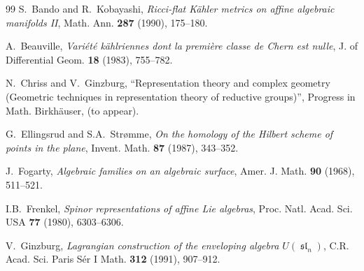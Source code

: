 \documentclass[12pt]{amsart}
\renewcommand{\frak}{\mathfrak}
\theoremstyle{definition}
\theoremstyle{remark}
\numberwithin{equation}{section}
\newcommand{\algsl}{\operatorname{\frak{sl}}} %
\begin{document}
\begin{thebibliography}{99}
 S.~Bando and R.~Kobayashi,
{\it Ricci-flat K\"ahler metrics on affine algebraic manifolds II},
Math. Ann. {\bf 287} (1990), 175--180.

 A.~Beauville,
{\it Vari\'et\'e k\"ahlriennes dont la premi\`ere classe de Chern est
  nulle},
J. of Differential Geom. {\bf 18} (1983), 755--782.




 N.~Chriss and V.~Ginzburg,
{``Representation theory and complex geometry (Geometric techniques in
  representation theory of reductive groups)''},
 Progress in Math. Birkh\"auser, (to appear).

 G.~Ellingsrud and S.A.~Str\o mme,
{\it On the homology of the Hilbert scheme of points in the plane},
Invent. Math. {\bf 87} (1987), 343--352.

 J.~Fogarty,
{\it Algebraic families on an algebraic surface},
Amer. J. Math. {\bf 90} (1968), 511--521.

 I.B.~Frenkel,
{\it Spinor representations of affine Lie algebras},
Proc. Natl. Acad. Sci. USA {\bf 77} (1980), 6303--6306.




 V.~Ginzburg,
 {\it Lagrangian construction of the enveloping algebra $U(\algsl_n)$},
 C.R. Acad. Sci. Paris S\'er I Math. {\bf 312} (1991), 907--912.


\end{thebibliography}
\end{document}

